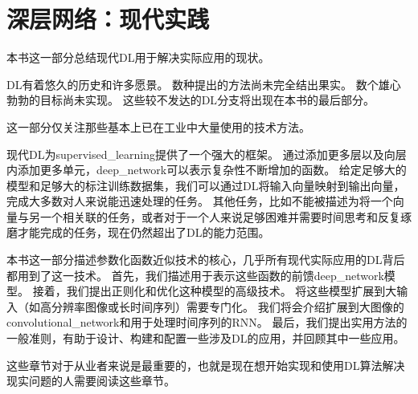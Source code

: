 \part{深层网络：现代实践}
\label{part:deep_networks_modern_practices}

\newpage
本书这一部分总结现代\gls{DL}用于解决实际应用的现状。

\gls{DL}有着悠久的历史和许多愿景。
数种提出的方法尚未完全结出果实。
数个雄心勃勃的目标尚未实现。
这些较不发达的\gls{DL}分支将出现在本书的最后部分。

这一部分仅关注那些基本上已在工业中大量使用的技术方法。

现代\gls{DL}为\gls{supervised_learning}提供了一个强大的框架。
通过添加更多层以及向层内添加更多单元，\gls{deep_network}可以表示复杂性不断增加的函数。
给定足够大的模型和足够大的标注训练数据集，我们可以通过\gls{DL}将输入向量映射到输出向量，完成大多数对人来说能迅速处理的任务。
其他任务，比如不能被描述为将一个向量与另一个相关联的任务，或者对于一个人来说足够困难并需要时间思考和反复琢磨才能完成的任务，现在仍然超出了\gls{DL}的能力范围。

本书这一部分描述参数化函数近似技术的核心，几乎所有现代实际应用的\gls{DL}背后都用到了这一技术。
首先，我们描述用于表示这些函数的前馈\gls{deep_network}模型。
接着，我们提出正则化和优化这种模型的高级技术。
将这些模型扩展到大输入（如高分辨率图像或长时间序列）需要专门化。
我们将会介绍扩展到大图像的\gls{convolutional_network}和用于处理时间序列的\gls{RNN}。
最后，我们提出实用方法的一般准则，有助于设计、构建和配置一些涉及\gls{DL}的应用，并回顾其中一些应用。

这些章节对于从业者来说是最重要的，也就是现在想开始实现和使用\gls{DL}算法解决现实问题的人需要阅读这些章节。




 






